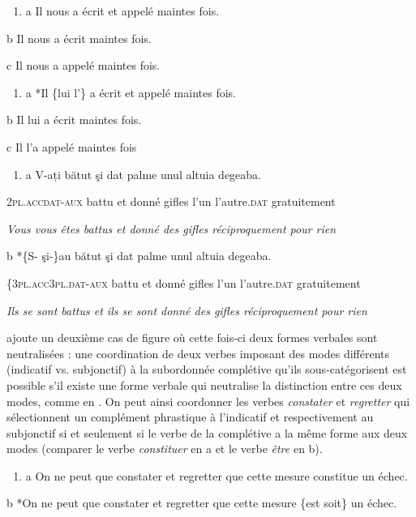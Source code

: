 \begin{enumerate}
\item \label{bkm:Ref300600124}a  Il nous a écrit et appelé maintes fois.


\end{enumerate}
  b  Il nous a écrit maintes fois.

  c  Il nous a appelé maintes fois.


\begin{enumerate}
\item \label{bkm:Ref300600409}a  *Il \{lui {\textbar} l'\} a écrit et appelé maintes fois.


\end{enumerate}
  b  Il lui a écrit maintes fois.

  c  Il l'a appelé maintes fois


\begin{enumerate}
\item \label{bkm:Ref269816990}a  V-ați  bătut  şi  dat  palme  unul  altuia  degeaba.


\end{enumerate}
\textsc{2pl.acc{\textbar}dat-aux}  battu  et  donné  gifles  l'un  l'autre.\textsc{dat}  gratuitement

{\itshape
  Vous vous êtes battus et donné des gifles réciproquement pour rien}

  b  *\{S- {\textbar} şi-\}au  bătut  şi  dat  palme  unul  altuia  degeaba.

\textsc{\{3pl.acc{\textbar}3pl.dat-aux}  battu  et  donné  gifles  l'un  l'autre.\textsc{dat}  gratuitement

{\itshape
Ils se sont battus et ils se sont donné des gifles réciproquement pour rien}

\citet{Mouret2007} ajoute un deuxième cas de figure où cette fois-ci deux formes verbales sont neutralisées : une coordination de deux verbes imposant des modes différents (indicatif vs. subjonctif) à la subordonnée complétive qu'ils sous-catégorisent est possible s'il existe une forme verbale qui neutralise la distinction entre ces deux modes, comme en . On peut ainsi coordonner les verbes \textit{constater} et \textit{regretter} qui sélectionnent un complément phrastique à l'indicatif et respectivement au subjonctif si et seulement si le verbe de la complétive a la même forme aux deux modes (comparer le verbe \textit{constituer} en a et le verbe \textit{être} en b).


\begin{enumerate}
\item \label{bkm:Ref269816994}a  On ne peut que constater et regretter que cette mesure constitue un échec.


\end{enumerate}
  b  *On ne peut que constater et regretter que cette mesure \{est {\textbar} soit\} un échec.

